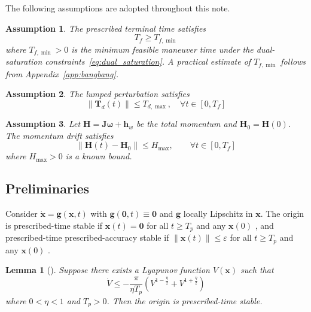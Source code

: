 \documentclass[journal]{new-aiaa}
\newtheorem{lemma}{Lemma}
\newtheorem{assumption}{Assumption}
\begin{document}
The following assumptions are adopted throughout this note.

\begin{assumption}\label{ass:feasible_Tf}
The prescribed terminal time satisfies
\begin{equation}
T_f \ge T_{f,\min}
\label{eq:T_f_feasible}
\end{equation}
where $T_{f,\min}>0$ is the minimum feasible maneuver time under the dual-saturation constraints~\eqref{eq:dual_saturation}.
A practical estimate of $T_{f,\min}$ follows from Appendix~\ref{app:bangbang}.
\end{assumption}

\begin{assumption}\label{ass:disturbance_bound}
The lumped perturbation satisfies
\begin{equation}
\|\boldsymbol{T}_d(t)\| \le T_{d,\max}, \quad \forall t\in[0,T_f]
\label{eq:Td_bound}
\end{equation}
\end{assumption}

\begin{assumption}\label{ass:H_budget}
Let $\boldsymbol{H}=\boldsymbol{J}\boldsymbol{\omega}+\boldsymbol{h}_w$ be the total momentum and $\boldsymbol{H}_0=\boldsymbol{H}(0)$.
The momentum drift satisfies
\begin{equation}
\|\boldsymbol{H}(t)-\boldsymbol{H}_0\| \le H_{\max}, \qquad \forall t \in [0, T_f]
\label{eq:Hmax}
\end{equation}
where $H_{\max} > 0$ is a known bound.
\end{assumption}

\subsection{Preliminaries}
Consider $\dot{\boldsymbol{x}} = \boldsymbol{g}(\boldsymbol{x},t)$ with $\boldsymbol{g}(\boldsymbol{0},t)\equiv\boldsymbol{0}$ and $\boldsymbol{g}$ locally Lipschitz in $\boldsymbol{x}$.
The origin is prescribed-time stable if $\boldsymbol{x}(t)=\boldsymbol{0}$ for all $t\ge T_p$ and any $\boldsymbol{x}(0)$
\cite{sanchez-torres_predefined-time_2015},
and prescribed-time prescribed-accuracy stable if $\|\boldsymbol{x}(t)\|\le\varepsilon$ for all $t\ge T_p$ and any $\boldsymbol{x}(0)$
\cite{xiao_scaling-transformation-based_2025}.

\begin{lemma}[\cite{anguiano-gijon_predefined-time_2019}]\label{lem:PT}
Suppose there exists a Lyapunov function $V(\boldsymbol{x})$ such that
\begin{equation}
\dot V \le -\frac{\pi}{\eta T_p}\left(V^{1-\tfrac{\eta}{2}}+V^{1+\tfrac{\eta}{2}}\right)
\label{eq:lemma_PT_cond}
\end{equation}
where $0<\eta<1$ and $T_p>0$. Then the origin is prescribed-time stable.
\end{lemma}
\end{document}
